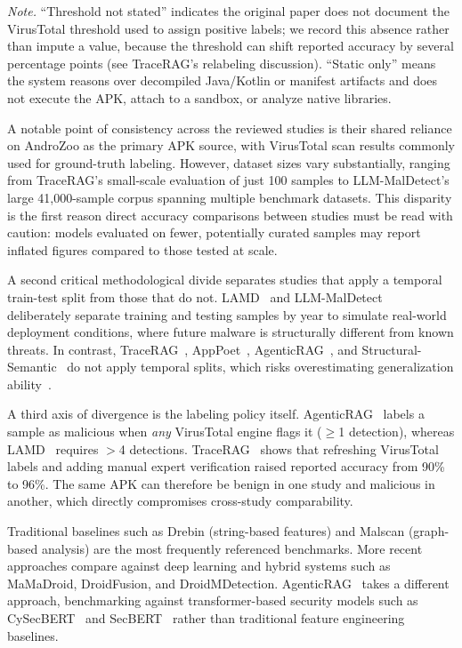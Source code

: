 \begin{table}[htbp]
\vspace{2pt}
\footnotesize\textit{Note.} ``Threshold not stated'' indicates the original paper does not document the VirusTotal threshold used to assign positive labels; we record this absence rather than impute a value, because the threshold can shift reported accuracy by several percentage points (see TraceRAG's relabeling discussion). ``Static only'' means the system reasons over decompiled Java/Kotlin or manifest artifacts and does not execute the APK, attach to a sandbox, or analyze native libraries.
\end{table}

A notable point of consistency across the reviewed studies is their shared reliance on AndroZoo as the primary APK source, with VirusTotal scan results commonly used for ground-truth labeling. However, dataset sizes vary substantially, ranging from TraceRAG's small-scale evaluation of just 100 samples to LLM-MalDetect's large 41{,}000-sample corpus spanning multiple benchmark datasets. This disparity is the first reason direct accuracy comparisons between studies must be read with caution: models evaluated on fewer, potentially curated samples may report inflated figures compared to those tested at scale.

A second critical methodological divide separates studies that apply a temporal train-test split from those that do not. LAMD~\cite{Qian2025-ua} and LLM-MalDetect~\cite{Feng2025-ry} deliberately separate training and testing samples by year to simulate real-world deployment conditions, where future malware is structurally different from known threats. In contrast, TraceRAG~\cite{Zhang2025-ot}, AppPoet~\cite{Zhao2024-dw}, AgenticRAG~\cite{S2025-kj}, and Structural-Semantic~\cite{Khan2024-hy} do not apply temporal splits, which risks overestimating generalization ability~\cite{pendlebury2019tesseract,barbero2022transcending}.

A third axis of divergence is the labeling policy itself. AgenticRAG~\cite{S2025-kj} labels a sample as malicious when \emph{any} VirusTotal engine flags it ($\geq$1 detection), whereas LAMD~\cite{Qian2025-ua} requires $>$4 detections. TraceRAG~\cite{Zhang2025-ot} shows that refreshing VirusTotal labels and adding manual expert verification raised reported accuracy from 90\% to 96\%. The same APK can therefore be benign in one study and malicious in another, which directly compromises cross-study comparability.

Traditional baselines such as Drebin (string-based features) and Malscan (graph-based analysis) are the most frequently referenced benchmarks. More recent approaches compare against deep learning and hybrid systems such as MaMaDroid, DroidFusion, and DroidMDetection. AgenticRAG~\cite{S2025-kj} takes a different approach, benchmarking against transformer-based security models such as CySecBERT~\cite{Bayer2024} and SecBERT~\cite{Huang2024} rather than traditional feature engineering baselines.

